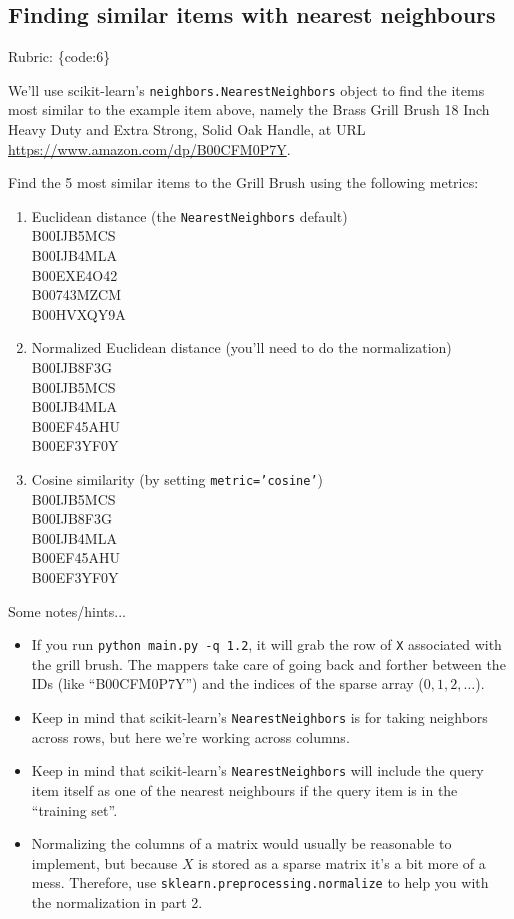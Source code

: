 \documentclass{article}
\def\rubric#1{\gre{Rubric: \{#1\}}}{}
\def\blu#1{{\color{blu}#1}}
\def\gre#1{{\color{gre}#1}}
\def\red#1{{\color{red}#1}}
\begin{document}
\subsection{Finding similar items with nearest neighbours}
\rubric{code:6}

We'll use scikit-learn's \texttt{neighbors.NearestNeighbors} object to find the items most similar to the example item above, namely the Brass Grill Brush 18 Inch Heavy Duty and Extra Strong, Solid Oak Handle, at URL \url{https://www.amazon.com/dp/B00CFM0P7Y}.

\blu{Find the 5 most similar items to the Grill Brush using the following metrics:}

\begin{enumerate}
\item Euclidean distance (the \texttt{NearestNeighbors} default) \\
\red{B00IJB5MCS \\
B00IJB4MLA \\
B00EXE4O42 \\
B00743MZCM \\
B00HVXQY9A}
\item Normalized Euclidean distance (you'll need to do the normalization) \\
\red{B00IJB8F3G \\
B00IJB5MCS \\
B00IJB4MLA \\
B00EF45AHU \\
B00EF3YF0Y}
\item Cosine similarity (by setting \texttt{metric='cosine'}) \\
\red{B00IJB5MCS \\
B00IJB8F3G \\
B00IJB4MLA \\
B00EF45AHU \\
B00EF3YF0Y}
\end{enumerate}

Some notes/hints...

\begin{itemize}
\item If you run \texttt{python main.py -q 1.2}, it will grab the row of \texttt{X} associated with the grill brush. The mappers take care of going back and forther between the IDs (like ``B00CFM0P7Y'') and the indices of the sparse array ($0,1,2,\ldots$).
\item Keep in mind that scikit-learn's \texttt{NearestNeighbors} is for taking neighbors across rows, but here we're working across columns.
\item Keep in mind that scikit-learn's \texttt{NearestNeighbors} will include the query item itself as one of the nearest neighbours if the query item is in the ``training set''.
\item Normalizing the columns of a matrix would usually be reasonable to implement, but because $X$ is stored as a sparse matrix it's a bit more of a mess. Therefore, use \texttt{sklearn.preprocessing.normalize} to help you with the normalization in part 2.
\end{itemize}
\end{document}
